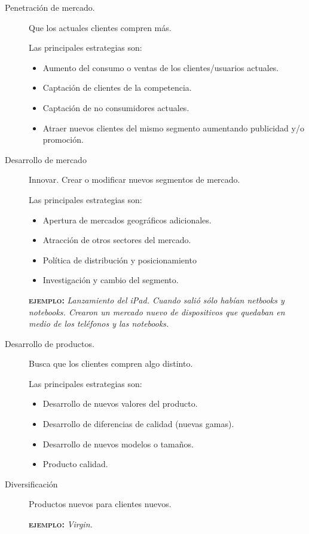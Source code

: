 \documentclass[10pt, spanish, a5paper]{article}
\begin{document}
\begin{description}
	\item[Penetración de mercado.] Que los actuales clientes compren más.
	
	Las principales estrategias son:
	\begin{itemize}
	\item Aumento del consumo o ventas de los clientes/usuarios actuales.
	\item Captación de clientes de la competencia.
	\item Captación de no consumidores actuales.
	\item Atraer nuevos clientes del mismo segmento aumentando publicidad y/o promoción.
	\end{itemize}
	
	\item[Desarrollo de mercado] Innovar. Crear o modificar nuevos segmentos de mercado.
	
	Las principales estrategias son:
	\begin{itemize}
	\item Apertura de mercados geográficos adicionales.
	\item Atracción de otros sectores del mercado.
	\item Política de distribución y posicionamiento
	\item Investigación y cambio del segmento.
	\end{itemize}
	
	\textsc{\textbf{ejemplo:}}\textit{ Lanzamiento del iPad. Cuando salió sólo habían netbooks y notebooks. Crearon un mercado nuevo de dispositivos que quedaban en medio de los teléfonos y las notebooks.}
	
	\item[Desarrollo de productos.] Busca que los clientes compren algo distinto.

Las principales estrategias son:
\begin{itemize}
	\item Desarrollo de nuevos valores del producto.
	\item Desarrollo de diferencias de calidad (nuevas gamas).
	\item Desarrollo de nuevos modelos o tamaños.
	\item Producto calidad.
\end{itemize}

\item[Diversificación] Productos nuevos para clientes nuevos.

	\textsc{\textbf{ejemplo:}}\textit{ Virgin.}
\end{description}
\end{document}
